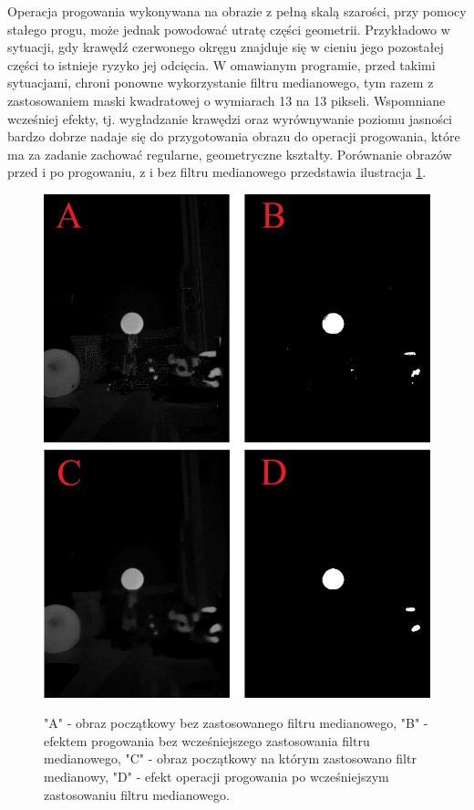 Operacja progowania wykonywana na obrazie z pełną skalą szarości, przy pomocy stałego progu, może jednak powodować utratę części geometrii. Przykładowo w sytuacji, gdy krawędź czerwonego okręgu znajduje się w cieniu jego pozostałej części to istnieje ryzyko jej odcięcia. W omawianym programie, przed takimi sytuacjami, chroni ponowne wykorzystanie filtru medianowego, tym razem z zastosowaniem maski kwadratowej o wymiarach 13 na 13 pikseli. Wspomniane wcześniej efekty, tj. wygładzanie krawędzi oraz wyrównywanie poziomu jasności bardzo dobrze nadaje się do przygotowania obrazu do operacji progowania, które ma za zadanie zachować regularne, geometryczne kształty. Porównanie obrazów przed i po progowaniu, z i bez filtru medianowego przedstawia ilustracja \ref{threshold}.
\begin{figure}[H]
\begin{center}
\includegraphics[scale=0.6]{imgs/img_prog+med.jpg}
\caption[Efekt progowania z oraz bez filtru medianowego.]\small{"A" - obraz początkowy bez zastosowanego filtru medianowego, "B" - efektem progowania bez wcześniejszego zastosowania filtru medianowego, "C" - obraz początkowy na którym zastosowano filtr medianowy, "D" - efekt operacji progowania po wcześniejszym zastosowaniu filtru medianowego.}
\label{threshold}
\end{center}
\end{figure}
